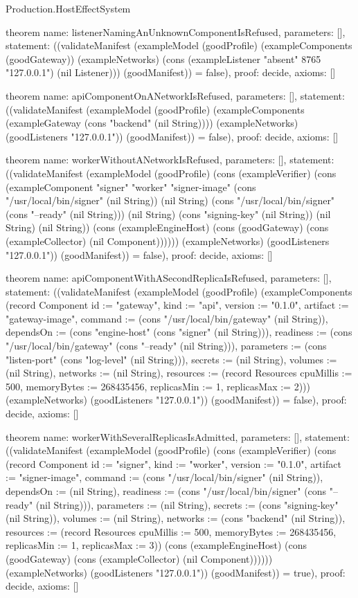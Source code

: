 \begin{lexlean}{Production.HostEffectSystem}
\begin{semanticmodule}
theorem{
  name: listenerNamingAnUnknownComponentIsRefused,
  parameters: [],
  statement: ((validateManifest (exampleModel (goodProfile) (exampleComponents (goodGateway)) (exampleNetworks) (cons (exampleListener "absent" 8765 "127.0.0.1") (nil Listener))) (goodManifest)) = false),
  proof: decide{},
  axioms: []
}

theorem{
  name: apiComponentOnANetworkIsRefused,
  parameters: [],
  statement: ((validateManifest (exampleModel (goodProfile) (exampleComponents (exampleGateway (cons "backend" (nil String)))) (exampleNetworks) (goodListeners "127.0.0.1")) (goodManifest)) = false),
  proof: decide{},
  axioms: []
}

theorem{
  name: workerWithoutANetworkIsRefused,
  parameters: [],
  statement: ((validateManifest (exampleModel (goodProfile) (cons (exampleVerifier) (cons (exampleComponent "signer" "worker" "signer-image" (cons "/usr/local/bin/signer" (nil String)) (nil String) (cons "/usr/local/bin/signer" (cons "--ready" (nil String))) (nil String) (cons "signing-key" (nil String)) (nil String) (nil String)) (cons (exampleEngineHost) (cons (goodGateway) (cons (exampleCollector) (nil Component)))))) (exampleNetworks) (goodListeners "127.0.0.1")) (goodManifest)) = false),
  proof: decide{},
  axioms: []
}

theorem{
  name: apiComponentWithASecondReplicaIsRefused,
  parameters: [],
  statement: ((validateManifest (exampleModel (goodProfile) (exampleComponents (record Component {id := "gateway", kind := "api", version := "0.1.0", artifact := "gateway-image", command := (cons "/usr/local/bin/gateway" (nil String)), dependsOn := (cons "engine-host" (cons "signer" (nil String))), readiness := (cons "/usr/local/bin/gateway" (cons "--ready" (nil String))), parameters := (cons "listen-port" (cons "log-level" (nil String))), secrets := (nil String), volumes := (nil String), networks := (nil String), resources := (record Resources {cpuMillis := 500, memoryBytes := 268435456, replicasMin := 1, replicasMax := 2})})) (exampleNetworks) (goodListeners "127.0.0.1")) (goodManifest)) = false),
  proof: decide{},
  axioms: []
}

theorem{
  name: workerWithSeveralReplicasIsAdmitted,
  parameters: [],
  statement: ((validateManifest (exampleModel (goodProfile) (cons (exampleVerifier) (cons (record Component {id := "signer", kind := "worker", version := "0.1.0", artifact := "signer-image", command := (cons "/usr/local/bin/signer" (nil String)), dependsOn := (nil String), readiness := (cons "/usr/local/bin/signer" (cons "--ready" (nil String))), parameters := (nil String), secrets := (cons "signing-key" (nil String)), volumes := (nil String), networks := (cons "backend" (nil String)), resources := (record Resources {cpuMillis := 500, memoryBytes := 268435456, replicasMin := 1, replicasMax := 3})}) (cons (exampleEngineHost) (cons (goodGateway) (cons (exampleCollector) (nil Component)))))) (exampleNetworks) (goodListeners "127.0.0.1")) (goodManifest)) = true),
  proof: decide{},
  axioms: []
}


\end{semanticmodule}
\end{lexlean}
